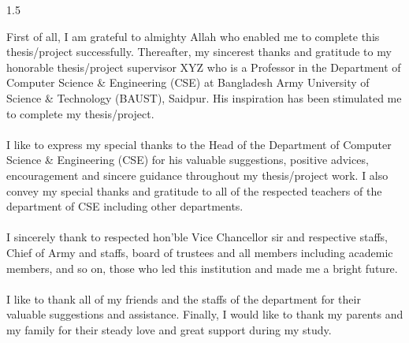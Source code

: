 \begin{spacing}{1.5}
    
\vspace{1.5cm}
First of all, I am grateful to almighty Allah who enabled me to complete this thesis/project successfully. Thereafter, my sincerest thanks and gratitude to my honorable thesis/project supervisor XYZ who is a Professor in the Department of Computer Science \& Engineering (CSE) at Bangladesh Army University of Science \& Technology (BAUST), Saidpur. His inspiration has been stimulated me to complete my thesis/project.\\ \\
I like to express my special thanks to the Head of the Department of Computer Science \& Engineering (CSE) for his valuable suggestions, positive advices, encouragement and sincere guidance throughout my thesis/project work. I also convey my special thanks and gratitude to all of the respected teachers of the department of CSE including other departments.\\ \\
I sincerely thank to respected hon’ble Vice Chancellor sir and respective staffs, Chief of Army and staffs, board of trustees and all members including academic members, and so on, those who led this institution and made me a bright future. \\  \\
I like to thank all of my friends and the staffs of the department for their valuable suggestions and assistance. Finally, I would like to thank my parents and my family for their steady love and great support during my study.

\end{spacing}
